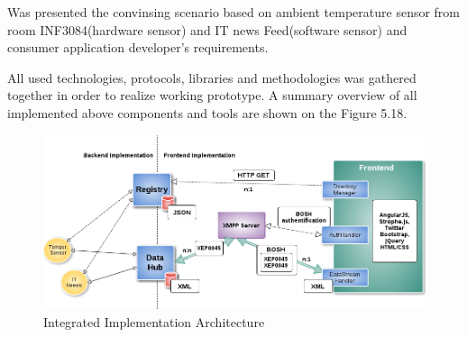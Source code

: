 Was presented the convinsing scenario based on ambient temperature sensor from room INF3084(hardware sensor) and IT news Feed(software sensor) and consumer application developer's requirements.

All used technologies, protocols, libraries and methodologies was gathered together in order to realize working prototype. A summary overview of all implemented above components and tools are shown on the Figure 5.18.
\begin{figure}[H]
\centering
\includegraphics[scale=0.5]{images/ch5Summary.png}   
\caption[Implementation Architecture]{Integrated Implementation Architecture}                         
\end{figure}

